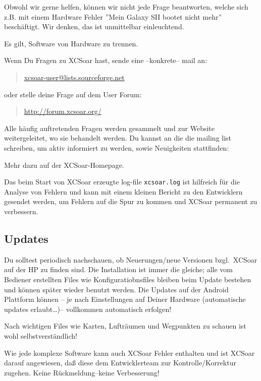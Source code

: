 Obwohl wir gerne helfen, können wir nicht jede Frage beantworten, welche sich z.B. mit einem 
Hardware Fehler ''Mein  Galaxy SII bootet nicht mehr'' beschäftigt. Wir denken, das ist unmittelbar einleuchtend.

Es gilt, Software von Hardware zu trennen. 

Wenn Du Fragen zu \textsf{XCSoar} hast, sende eine --konkrete-- mail an: 

\begin{quote}
\url{xcsoar-user@lists.sourceforge.net}
\end{quote}
oder stelle deine Frage auf dem User Forum:
\begin{quote}
\url{http://forum.xcsoar.org/}
\end{quote}

Alle häufig auftretenden Fragen werden gesammelt und zur Website weitergeleitet, wo sie behandelt werden.
Du kannst an die die mailing list schreiben, um aktiv informiert zu werden, sowie Neuigkeiten stattfinden: 

Mehr dazu auf der \textsf{XCSoar}-Homepage. 
\begin{quote}
\xcsoarwebsite{}
\end{quote}

Das beim Start von \textsf{XCSoar} erzeugte log-file \verb|xcsoar.log| ist hilfreich für die Analyse von Fehlern und kann  
mit einem kleinen Bericht zu den Entwicklern gesendet werden, um Fehlern auf die Spur zu kommen 
und \textsf{XCSoar} permanent zu verbessern. 

\subsection*{Updates}
Du solltest periodisch nachschauen, ob Neuerungen/neue Versionen  bzgl.\ \textsf{XCSoar} auf der HP zu finden sind. 
Die Installation ist immer die gleiche; alle vom Bediener erstellten Files wie Konfiguratiobnsfiles 
bleiben beim Update bestehen und können später wieder benutzt werden. Die Updates auf der Android Plattform können -- je nach Einstellungen auf Deiner Hardware  (automatische updates erlaubt\dots)-- vollkommen automatisch erfolgen! 

Nach wichtigen Files wie Karten, Lufträumen und Wegpunkten zu schauen ist wohl selbstverständlich!


Wie jede komplexe Software kann auch \textsf{XCSoar} Fehler enthalten und ist \textsf{XCSoar} darauf angewiesen, daß diese dem Entwicklerteam zur  Kontrolle/Korrektur zugehen. Keine Rückmeldung--keine Verbesserung!

